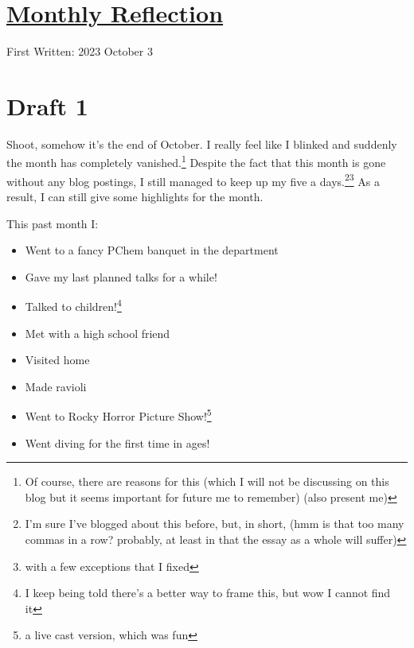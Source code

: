 \documentclass[12pt]{article}[titlepage]
\renewcommand{\,}{\textsuperscript{,}}
\begin{document}
\doublespacing
\section{\href{reflection-october-23.html}{Monthly Reflection}}
First Written: 2023 October 3

\section{Draft 1}
Shoot, somehow it's the end of October.
I really feel like I blinked and suddenly the month has completely vanished.\footnote{Of course, there are reasons for this (which I will not be discussing on this blog but it seems important for future me to remember) (also present me)}
Despite the fact that this month is gone without any blog postings, I still managed to keep up my five a days.\footnote{I'm sure I've blogged about this before, but, in short, (hmm is that too many commas in a row? probably, at least in that the essay as a whole will suffer)}\footnote{with a few exceptions that I fixed}
As a result, I can still give some highlights for the month.

This past month I:
\begin{itemize}
\item Went to a fancy PChem banquet in the department
\item Gave my last planned talks for a while!
\item Talked to children!\footnote{I keep being told there's a better way to frame this, but wow I cannot find it}
\item Met with a high school friend
\item Visited home
\item Made ravioli
\item Went to Rocky Horror Picture Show!\footnote{a live cast version, which was fun}
\item Went diving for the first time in ages!
\end{itemize}
\end{document}
